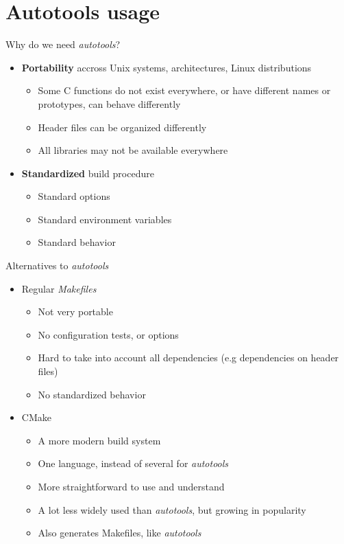 \section{Autotools usage}

\begin{frame}{Why do we need {\em autotools}?}
  \begin{itemize}
  \item {\bf Portability} accross Unix systems, architectures, Linux
    distributions
    \begin{itemize}
    \item Some C functions do not exist everywhere, or have different
      names or prototypes, can behave differently
    \item Header files can be organized differently
    \item All libraries may not be available everywhere
    \end{itemize}
  \item {\bf Standardized} build procedure
    \begin{itemize}
    \item Standard options
    \item Standard environment variables
    \item Standard behavior
    \end{itemize}
  \end{itemize}
\end{frame}

\begin{frame}{Alternatives to {\em autotools}}
  \begin{itemize}
  \item Regular {\em Makefiles}
    \begin{itemize}
    \item Not very portable
    \item No configuration tests, or options
    \item Hard to take into account all dependencies (e.g dependencies
      on header files)
    \item No standardized behavior
    \end{itemize}
  \item CMake
    \begin{itemize}
    \item A more modern build system
    \item One language, instead of several for {\em autotools}
    \item More straightforward to use and understand
    \item A lot less widely used than {\em autotools}, but growing in
      popularity
    \item Also generates Makefiles, like {\em autotools}
    \end{itemize}
  \end{itemize}
\end{frame}

